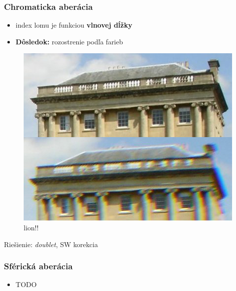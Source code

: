 \documentclass[10pt,xcolor=pdflatex]{beamer}
\begin{document}
\begin{frame}\frametitle{Chromaticka aberácia}
    \begin{itemize}
        \item index lomu je funkciou \textbf{vlnovej dĺžky}
        \item \textbf{Dôsledok:} rozostrenie podľa farieb 
    \end{itemize}

    \begin{figure}
        \includegraphics[scale=0.4]{img/chromaticAberrationWikipedia.jpg}
        \caption{lion!!}
    \end{figure}
    Riešienie: \textit{doublet}, SW korekcia 
\end{frame}

\begin{frame}\frametitle{Sférická aberácia}
    \begin{itemize}
        \item TODO
    \end{itemize}
\end{frame}

\end{document}
